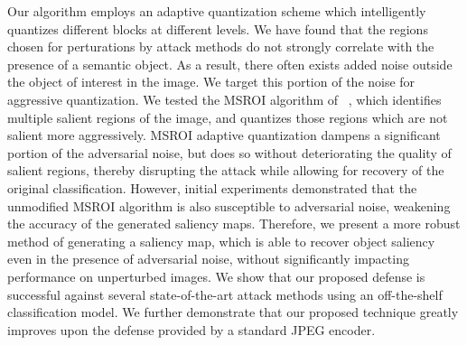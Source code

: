 Our algorithm employs an adaptive quantization scheme which intelligently quantizes different blocks at different levels. 
We have found that the regions chosen for perturations by attack methods do not strongly correlate with the presence of a semantic object.
As a result, there often exists added noise outside the object of interest in the image. We target this portion of the noise for aggressive quantization.
We tested the MSROI algorithm of  ~\cite{Prakash2017SemanticPI}, which identifies multiple salient regions of the image, and quantizes those regions which are not salient more aggressively. %
MSROI adaptive quantization dampens a significant portion of the adversarial noise, but does so without deteriorating the quality of salient regions, thereby disrupting the attack while allowing for recovery of the original classification.
However, initial experiments demonstrated that the unmodified MSROI algorithm is also susceptible to adversarial noise, weakening the accuracy of the generated saliency maps.
Therefore, we present a more robust method of generating a saliency map, which is able to recover object saliency even in the presence of adversarial noise, without significantly impacting performance on unperturbed images.
We show that our proposed defense is successful against several state-of-the-art attack methods using an off-the-shelf classification model.
We further demonstrate that our proposed technique greatly improves upon the defense provided by a standard JPEG encoder.

